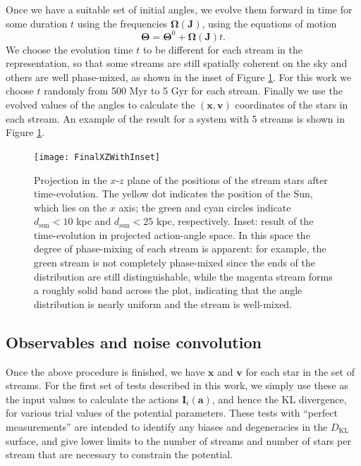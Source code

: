 \documentclass[useAMS,usenatbib,a4paper]{mn2e}
\newcommand{\sub}[2]{\ensuremath{#1_{\mathrm{#2}}}}
\begin{document}
Once we have a suitable set of initial angles, we evolve them forward in time for some duration $t$ using the frequencies $\mathbf{\Omega}(\mathbf{J})$, using the equations of motion
\begin{equation}
 \mathbf{\Theta} = \mathbf{\Theta}^{0} + \mathbf{\Omega}(\mathbf{J}) t.
\end{equation} 
We choose the evolution time $t$ to be different for each stream in the representation, so that some streams are still spatially coherent on the sky and others are well phase-mixed, as shown in the inset of Figure \ref{fig:streams}. For this work we choose $t$ randomly from 500 Myr to 5 Gyr for each stream. Finally we use the evolved values of the angles to calculate the $(\mathbf{x},\mathbf{v})$ coordinates of the stars in each stream. An example of the result for a system with 5 streams is shown in Figure \ref{fig:streams}.

\begin{figure}
 \texttt{[image: FinalXZWithInset]}
\caption{Projection in the $x$-$z$ plane of the positions of the stream stars after time-evolution. The yellow dot indicates the position of the Sun, which lies on the $x$ axis; the green and cyan circles indicate $\sub{d}{sun} < 10$ kpc and $\sub{d}{sun}<25$ kpc, respectively. Inset: result of the time-evolution in projected action-angle space. In this space the degree of phase-mixing of each stream is apparent: for example, the green stream is not completely phase-mixed since the ends of the distribution are still distinguishable, while the magenta stream forms a roughly solid band across the plot, indicating that the angle distribution is nearly uniform and the stream is well-mixed.}
\label{fig:streams}
\end{figure}

\subsection{Observables and noise convolution}

Once the above procedure is finished, we have $\mathbf{x}$ and $\mathbf{v}$ for each star in the set of streams. For the first set of tests described in this work, we simply use these as the input values to calculate the actions $\mathbf{I}_i(\mathbf{a})$, and hence the KL divergence, for various trial values of the potential parameters. These tests with ``perfect measurements'' are intended to identify any biases and degeneracies in the $\sub{D}{KL}$ surface, and give lower limits to the number of streams and number of stars per stream that are necessary to constrain the potential.
\end{document}
